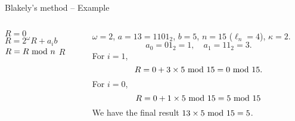 \begin{frame}{Blakely's method -- Example}
\begin{columns}[T] %
\begin{column}{.4\textwidth}
{
\setlength{\interspacetitleruled}{0pt}%
\setlength{\algotitleheightrule}{0pt}%
\begin{algorithm}[H]
$R=0$\\
 	{
 	$R=2^{\omega}R+a_ib$\\
        $R=R\textrm{~mod~} n$
  	}
  	\Return $R$
\end{algorithm}
}
\end{column}%
\hfill%
\begin{column}{.6\textwidth}
\begin{example}
    $\omega=2$,  $a=13=1101_2$, $b=5$, $n=15$ ($\ell_n=4$), $\kappa=2$.
    \[
    a_0=01_2=1,\quad a_1=11_2=3.
    \]
    For $i=1$,
    \[
    R=0+3\times5\textrm{~mod~} 15=0\textrm{~mod~} 15.
    \]
    For $i=0$, 
    \[
    R=0+1\times5\textrm{~mod~}15=5\textrm{~mod~}15
    \]
    We have the final result $13\times5\textrm{~mod~}15=5$.
\end{example}
\end{column}%
\end{columns}
\end{frame}


